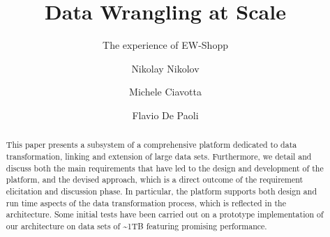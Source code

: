 \documentclass[sigconf,final]{acmart}
\begin{document}
\title{Data Wrangling at Scale}
\subtitle{The experience of EW-Shopp}


\author{Nikolay Nikolov}

\author{Michele Ciavotta}

\author{Flavio De Paoli}



\renewcommand{\shortauthors}{N. Nikolov et al.}


\begin{abstract}
This paper presents a subsystem of a comprehensive platform dedicated to data transformation, linking and extension of large data sets. Furthermore, we detail and discuss both the main requirements that have led to the design and development of the platform, and the devised approach, which is a direct outcome of the requirement elicitation and discussion phase. In particular, the platform supports both design and run time aspects of the data transformation process, which is reflected in the architecture. 
Some initial tests have been carried out on a prototype implementation of our architecture on data sets of \textasciitilde 1TB featuring promising performance. 
\end{abstract}
\end{document}
